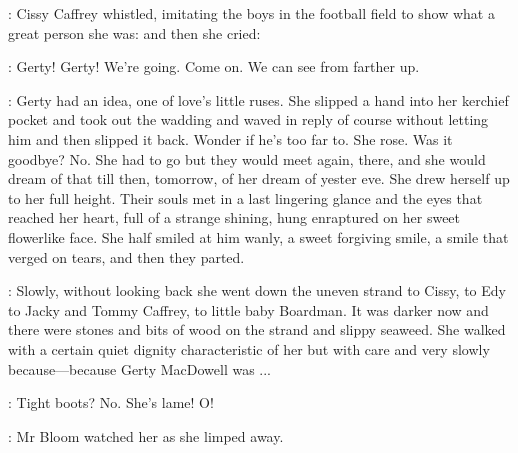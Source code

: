 :
Cissy Caffrey whistled, imitating the boys in the football field to show
what a great person she was: and then she cried:

\cissy:
Gerty! Gerty! We're going. Come on. We can see from farther up.

:
Gerty had an idea, one of love's little ruses. She slipped a hand into
her kerchief pocket and took out the wadding and waved in reply of course
without letting him and then slipped it back. Wonder if he's too far to.
She rose. Was it goodbye? No. She had to go but they would meet again,
there, and she would dream of that till then, tomorrow, of her dream of
yester eve. She drew herself up to her full height. Their souls met in a
last lingering glance and the eyes that reached her heart, full of a
strange shining, hung enraptured on her sweet flowerlike face. She half
smiled at him wanly, a sweet forgiving smile, a smile that verged on
tears, and then they parted.

:
Slowly, without looking back she went down the uneven strand to
Cissy, to Edy to Jacky and Tommy Caffrey, to little baby Boardman. It was
darker now and there were stones and bits of wood on the strand and slippy
seaweed. She walked with a certain quiet dignity characteristic of her but
with care and very slowly because—because Gerty MacDowell was ...

\Bloom:
Tight boots? No. She's lame! O!

:
Mr Bloom watched her as she limped away.

